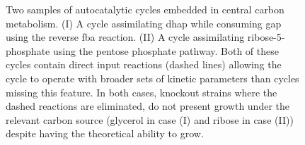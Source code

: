 \begin{figure}[h!]
    \centering{
        }
\caption{
    \label{fig:extrasamps}
    Two samples of autocatalytic cycles embedded in central carbon metabolism.
    (I) A cycle assimilating dhap while consuming gap using the reverse fba reaction.
    (II) A cycle assimilating ribose-5-phosphate using the pentose phosphate pathway.
    Both of these cycles contain direct input reactions (dashed lines) allowing the cycle to operate with broader sets of kinetic parameters than cycles missing this feature.
    In both cases, knockout strains where the dashed reactions are eliminated, do not present growth under the relevant carbon source (glycerol in case (I) and ribose in case (II)) despite having the theoretical ability to grow.
}
\end{figure}
 
